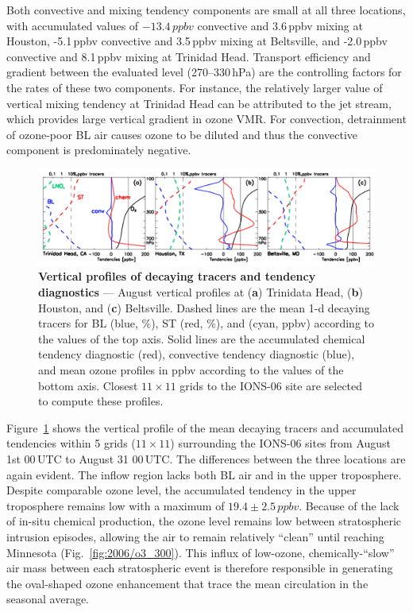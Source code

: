 Both convective and mixing tendency components are small at all three locations, with accumulated values of $-13.4\,\unit{ppbv}$ convective
and 3.6\,\unit{ppbv} mixing at Houston, -5.1\,\unit{ppbv} convective and 3.5\,\unit{ppbv} mixing at Beltsville, and -2.0\,\unit{ppbv} convective and
8.1\,\unit{ppbv} mixing at Trinidad Head. Transport efficiency and gradient between the evaluated level (270--330\,\unit{hPa}) are the controlling
factors for the rates of these two components. For instance, the relatively larger value of vertical mixing tendency at Trinidad Head can be
attributed to the jet stream, which provides large vertical gradient in ozone VMR. For convection, detrainment of ozone-poor BL
air causes ozone to be diluted and thus the convective component is predominately negative.

	\begin{figure}[t!]
		\centering
		 \label{fig:2006/tendency_vertical} 
		\includegraphics[width=1.0\textwidth]{tendency/vertical.png}
		\caption[Vertical profiles of decaying tracers and tendency diagnostics]{\textbf{Vertical profiles of decaying tracers
		and tendency diagnostics} --- August vertical profiles at ({\bf a}) Trinidata Head, ({\bf b}) Houston,
		and ({\bf c}) Beltsville. Dashed lines are the mean 1-d decaying tracers for BL (blue, \unit{\%}), ST (red, \unit{\%}), and {\lnox} (cyan,
		\unit{ppbv}) according to the values of the top axis. Solid lines are the accumulated chemical tendency diagnostic (red), convective
		tendency diagnostic (blue), and mean ozone profiles in \unit{ppbv} according to the values of the bottom axis. Closest $11\times11$
		grids to the IONS-06 site are selected to compute these profiles.}\vspace{-.3in}
	\end{figure}

Figure~\ref{fig:2006/tendency_vertical} shows the vertical profile of the mean decaying tracers and accumulated
tendencies within 5 grids ($11\times11$) surrounding the
IONS-06 sites from August 1st 00\,\unit{UTC} to August 31 00\,\unit{UTC}. The differences between the three locations are again evident. The inflow
region lacks both BL air and {\lnox} in the upper troposphere. Despite comparable ozone level, the accumulated tendency in the upper
troposphere remains low with a maximum of $19.4\pm2.5\,\unit{ppbv}$. Because of the lack of in-situ chemical production, the ozone level remains
low between stratospheric intrusion episodes, allowing the air to remain relatively ``clean'' until reaching Minnesota (Fig.~\ref{fig:2006/o3_300}).
This influx of low-ozone, chemically-``slow'' air mass between each stratospheric event is therefore responsible in generating the oval-shaped
ozone enhancement that trace the mean circulation in the seasonal average.

